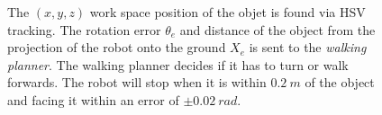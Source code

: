 \begin{figure}
\begin{tikzpicture}[->,>=stealth',shorten >=1pt,auto,node distance=5cm,
  thick,main node/.style={fill=white!20,draw,font=\sffamily\small\bfseries}]




\end{tikzpicture}
\caption{The $(x,y,z)$ work space position of the objet is found via HSV tracking.  The rotation error $\theta_e$ and distance of the object from the projection of the robot onto the ground $X_e$ is sent to the \textit{walking planner}.  The walking planner decides if it has to turn or walk forwards. The robot will stop when it is within $0.2~m$ of the object and facing it within an error of $\pm 0.02~rad$.}
\label{fig:hubo-ach-walkingVservoing}
\end{figure}

